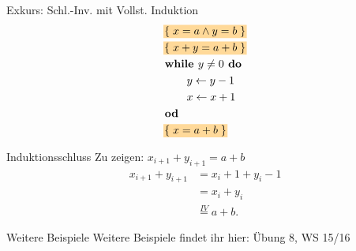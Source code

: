\begin{frame}{Exkurs: Schl.-Inv. mit Vollst. Induktion}
	\vspace{-2\baselineskip}
	\begin{align*}
	&\assert{x=a \land y=b}  \\
	&\assert{ x+y=a+b }\\
	&\kw{while } y\not=0 \kw{ do } \\
	&\qquad y \gets y-1 \\
	&\qquad x \gets x+1 \\
	&\kw{od } \\
	&\assert{x=a+b} \\
	\end{align*}
	\vspace{-2\baselineskip}
	\begin{block}{Induktionsschluss}
		Zu zeigen: $ x_{i+1} + y_{i+1} = a+b $ \pause
		\begin{align*}
		x_{i+1}+y_{i+1} &= x_i +1 + y_i -1 \\
		&= x_i + y_i \\
		&\overset{IV}{=} a+b.
		\end{align*}
	\end{block}
\end{frame}

\begin{frame} {Weitere Beispiele}
	Weitere Beispiele findet ihr hier: Übung 8, WS 15/16
\end{frame}